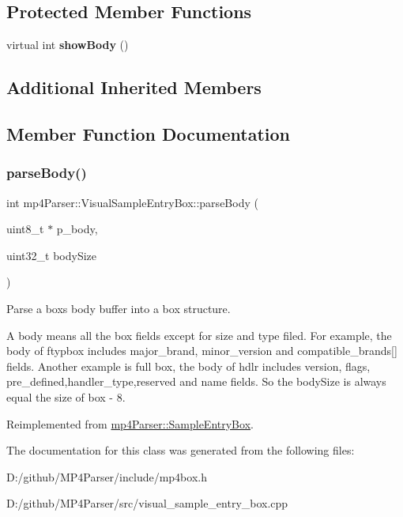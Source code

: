 \subsection*{Protected Member Functions}
\begin{DoxyCompactItemize}
\item 
\mbox{\label{classmp4_parser_1_1_visual_sample_entry_box_a23873faa3999c49ceef376ecf16bc2d4}} 
virtual int {\bfseries show\+Body} ()
\end{DoxyCompactItemize}
\subsection*{Additional Inherited Members}


\subsection{Member Function Documentation}
\mbox{\label{classmp4_parser_1_1_visual_sample_entry_box_a336c8d02232f769e50dcbd4c031bf274}} 
\subsubsection{\texorpdfstring{parseBody()}{parseBody()}}
{\footnotesize\ttfamily int mp4\+Parser\+::\+Visual\+Sample\+Entry\+Box\+::parse\+Body (\begin{DoxyParamCaption}\item[{uint8\+\_\+t $\ast$}]{p\+\_\+body,  }\item[{uint32\+\_\+t}]{body\+Size }\end{DoxyParamCaption})\hspace{0.3cm}{\ttfamily [virtual]}}



Parse a box\textquotesingle{}s body buffer into a box structure. 

A body means all the box fields except for size and type filed. For example, the body of ftypbox includes major\+\_\+brand, minor\+\_\+version and compatible\+\_\+brands\mbox{[}\mbox{]} fields. Another example is full box, the body of hdlr includes version, flags, pre\+\_\+defined,handler\+\_\+type,reserved and name fields. So the body\+Size is always equal the size of box -\/ 8. 

Reimplemented from \mbox{\hyperlink{classmp4_parser_1_1_sample_entry_box_a8ff77bc115eb18deee12619ebfc0eaa6}{mp4\+Parser\+::\+Sample\+Entry\+Box}}.



The documentation for this class was generated from the following files\+:\begin{DoxyCompactItemize}
\item 
D\+:/github/\+M\+P4\+Parser/include/mp4box.\+h\item 
D\+:/github/\+M\+P4\+Parser/src/visual\+\_\+sample\+\_\+entry\+\_\+box.\+cpp\end{DoxyCompactItemize}
